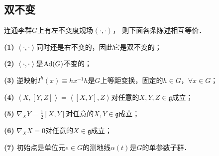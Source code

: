 \subsection{双不变}

\begin{theorem}\label{chlg:thm_biinmg}
    连通李群$G$上有左不变度规场$\left<\cdot,\cdot\right>$，
    则下面各条陈述相互等价．
    
    {\bfseries (1)} $\left<\cdot,\cdot\right>$同时还是右不变的，因此它是双不变的；
    
    {\bfseries (2)} $\left<\cdot,\cdot\right>$是${\rm Ad}(G)$不变的；
    
    {\bfseries (3)} 逆映射$I^h(x)\equiv h  x^{-1} h $是$G$上等距变换，固定的$h\in G$，$\forall x\in G$；
    
    {\bfseries (4)} $\left<X,[Y,Z]\right>=\left<[X,Y],Z\right>$对任意的$X,Y,Z\in \mathfrak{g}$成立；
    
    {\bfseries (5)} $\nabla_X Y = \frac{1}{2} [X,Y]$对任意的$X,Y\in \mathfrak{g}$成立；
    
    {\bfseries (6)} $\nabla_X X = 0$对任意的$X\in \mathfrak{g}$成立；
    
    {\bfseries (7)} 初始点是单位元$e\in G$的测地线$\alpha(t)$是$G$的单参数子群．
\end{theorem}
